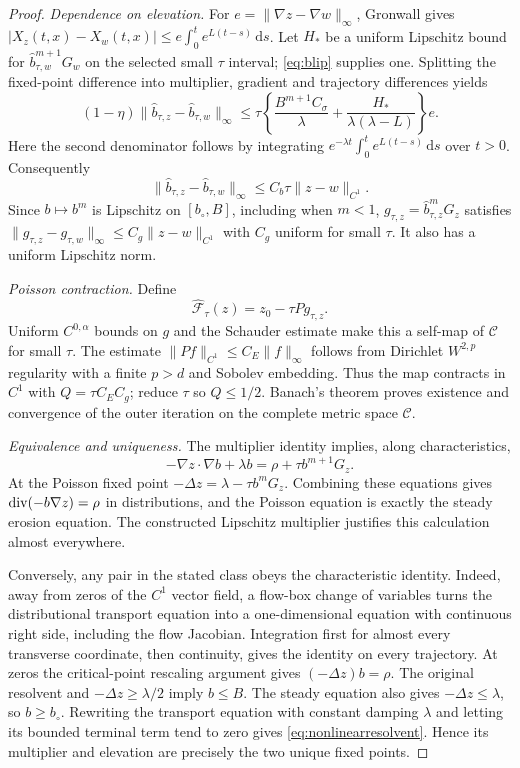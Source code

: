 \documentclass[11pt,a4paper]{article}
\theoremstyle{definition}\newtheorem{definition}[theorem]{Definition}
\theoremstyle{remark}\newtheorem{remark}[theorem]{Remark}
\newcommand{\dd}{\,\mathrm d}
\begin{document}
\begin{proof}
\emph{Dependence on elevation.} For $e=\|\nabla z-\nabla w\|_\infty$,
Gronwall gives $|X_z(t,x)-X_w(t,x)|\leq e\int_0^t e^{L(t-s)}\dd s$.
Let $H_*$ be a uniform Lipschitz bound for
$\widehat b_{\tau,w}^{m+1}G_w$ on the selected small $\tau$ interval;
\eqref{eq:blip} supplies one. Splitting the fixed-point difference into
multiplier, gradient and trajectory differences yields
\[
 (1-\eta)\|\widehat b_{\tau,z}-\widehat b_{\tau,w}\|_\infty
 \leq\tau\left\{\frac{B^{m+1}C_\sigma}{\lambda}
            +\frac{H_*}{\lambda(\lambda-L)}\right\}e.
\]
Here the second denominator follows by integrating
$e^{-\lambda t}\int_0^t e^{L(t-s)}\dd s$ over $t>0$.
Consequently
\begin{equation}
 \|\widehat b_{\tau,z}-\widehat b_{\tau,w}\|_\infty
 \leq C_b\tau\|z-w\|_{C^1}.\label{eq:bstability}
\end{equation}
Since $b\mapsto b^m$ is Lipschitz on $[b_\circ,B]$, including when $m<1$,
$g_{\tau,z}=\widehat b_{\tau,z}^{m}G_z$ satisfies
$\|g_{\tau,z}-g_{\tau,w}\|_\infty\leq C_g\|z-w\|_{C^1}$
with $C_g$ uniform for small $\tau$. It also has a uniform Lipschitz norm.

\emph{Poisson contraction.} Define
\begin{equation}
 \widehat{\mathcal F}_{\tau}(z)=z_0-\tau P g_{\tau,z}.
 \label{eq:contractivepoisson}
\end{equation}
Uniform $C^{0,\alpha}$ bounds on $g$ and the Schauder estimate make this a
self-map of $\mathcal C$ for small $\tau$.
The estimate $\|Pf\|_{C^1}\leq C_E\|f\|_\infty$ follows from Dirichlet
$W^{2,p}$ regularity with a finite $p>d$ and Sobolev embedding.
Thus the map contracts in $C^1$ with $Q=\tau C_EC_g$; reduce $\tau$ so
$Q\leq1/2$. Banach's theorem proves existence and convergence of the
outer iteration on the complete metric space $\mathcal C$.

\emph{Equivalence and uniqueness.} The multiplier identity implies, along
characteristics,
\[
 -\nabla z\cdot\nabla b+\lambda b=\rho+\tau b^{m+1}G_z.
\]
At the Poisson fixed point $-\Delta z=\lambda-\tau b^mG_z$.
Combining these equations gives $\operatorname{div}(-b\nabla z)=\rho$ in distributions,
and the Poisson equation is exactly the steady erosion equation.
The constructed Lipschitz multiplier justifies this calculation almost everywhere.

Conversely, any pair in the stated class obeys the characteristic identity.
Indeed, away from zeros of the $C^1$ vector field, a flow-box change of variables
turns the distributional transport equation into a one-dimensional equation
with continuous right side, including the flow Jacobian. Integration first for almost every transverse
coordinate, then continuity, gives the identity on every trajectory.
At zeros the critical-point rescaling argument gives $(-\Delta z)b=\rho$.
The original resolvent and $-\Delta z\geq\lambda/2$ imply $b\leq B$.
The steady equation also gives $-\Delta z\leq\lambda$, so $b\geq b_\circ$.
Rewriting the transport equation with constant damping $\lambda$ and letting
its bounded terminal term tend to zero gives \eqref{eq:nonlinearresolvent}.
Hence its multiplier and elevation are precisely the two unique fixed points.


\end{proof}
\end{document}
